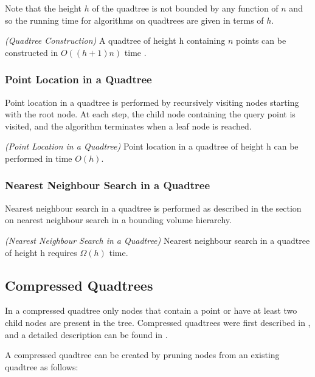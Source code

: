 \documentclass[mcs]{scsthesis}
\begin{document}
Note that the height $h$ of the quadtree is not bounded by any function of $n$
and so the running time for algorithms on quadtrees are given in terms of $h$.

\begin{thm} \emph{(Quadtree Construction)}
A quadtree of height h containing $n$ points can be constructed in \(O((h + 1)n)\)
time \cite{dutch}.
\end{thm}

\subsubsection{Point Location in a Quadtree}

Point location in a quadtree is performed by recursively visiting nodes
starting with the root node. At each step, the child node containing the query
point is visited, and the algorithm terminates when a leaf node is reached.

\begin{thm} \emph{(Point Location in a Quadtree)} 
Point location in a quadtree of height h can be performed in time \(O(h)\). 
\end{thm}

\subsubsection{Nearest Neighbour Search in a Quadtree}

Nearest neighbour search in a quadtree is performed as described in the section
on nearest neighbour search in a bounding volume hierarchy.

\begin{thm} \emph{(Nearest Neighbour Search in a Quadtree)} 
Nearest neighbour search in a quadtree of height h requires \(\Omega(h)\) time.
\end{thm}

\subsection{Compressed Quadtrees}

In a compressed quadtree only nodes that contain a point or have at least two
child nodes are present in the tree. Compressed quadtrees were first described
in \cite{compressedquadtree}, and a detailed description can be found in
\cite{skipquadtree}.

A compressed quadtree can be created by pruning nodes from an existing quadtree
as follows:
\end{document}
